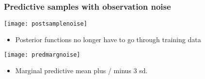 \begin{frame}
	\frametitle{Predictive samples with observation noise}
	\texttt{[image: postsamplenoise]}
	\begin{itemize}
		\item Posterior functions no longer have to go through training data
	\end{itemize}
\end{frame}

\begin{frame}
	\texttt{[image: predmargnoise]}
	\begin{itemize}
		\item Marginal predictive mean plus / minus 3 sd.
	\end{itemize}
\end{frame}



